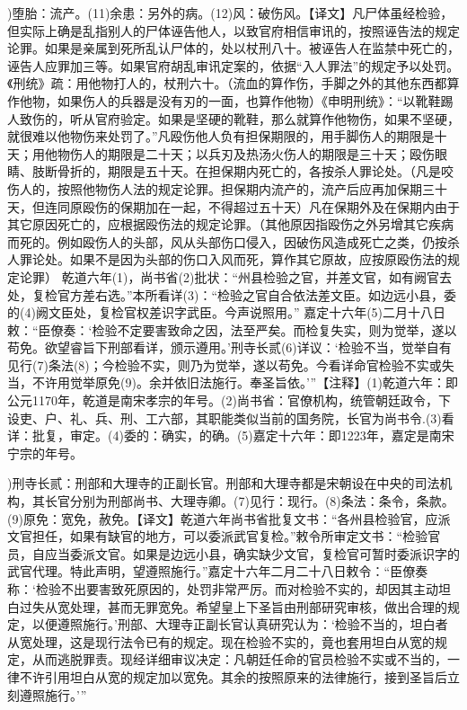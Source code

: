 \documentclass[12pt,UTF8]{ctexbook}
\begin{document}
)堕胎：流产。(11)余患：另外的病。(12)风：破伤风。【译文】凡尸体虽经检验，但实际上确是乱指别人的尸体诬告他人，以致官府相信审讯的，按照诬告法的规定论罪。如果是亲属到死所乱认尸体的，处以杖刑八十。被诬告人在监禁中死亡的，诬告人应罪加三等。如果官府胡乱审讯定案的，依据“入人罪法”的规定予以处罚。《刑统》疏：用他物打人的，杖刑六十。（流血的算作伤，手脚之外的其他东西都算作他物，如果伤人的兵器是没有刃的一面，也算作他物）《申明刑统》：“以靴鞋踢人致伤的，听从官府验定。如果是坚硬的靴鞋，那么就算作他物伤，如果不坚硬，就很难以他物伤来处罚了。”凡殴伤他人负有担保期限的，用手脚伤人的期限是十天；用他物伤人的期限是二十天；以兵刃及热汤火伤人的期限是三十天；殴伤眼睛、肢断骨折的，期限是五十天。在担保期内死亡的，各按杀人罪论处。（凡是咬伤人的，按照他物伤人法的规定论罪。担保期内流产的，流产后应再加保期三十天，但连同原殴伤的保期加在一起，不得超过五十天）凡在保期外及在保期内由于其它原因死亡的，应根据殴伤法的规定论罪。（其他原因指殴伤之外另增其它疾病而死的。例如殴伤人的头部，风从头部伤口侵入，因破伤风造成死亡之类，仍按杀人罪论处。如果不是因为头部的伤口入风而死，算作其它原故，应按原殴伤法的规定论罪）
乾道六年(1)，尚书省(2)批状：“州县检验之官，并差文官，如有阙官去处，复检官方差右选。”本所看详(3)：“检验之官自合依法差文臣。如边远小县，委的(4)阙文臣处，复检官权差识字武臣。今声说照用。”
嘉定十六年(5)二月十八日敕：“臣僚奏：‘检验不定要害致命之因，法至严矣。而检复失实，则为觉举，遂以苟免。欲望睿旨下刑部看详，颁示遵用。’刑寺长贰(6)详议：‘检验不当，觉举自有见行(7)条法(8)；今检验不实，则乃为觉举，遂以苟免。今看详命官检验不实或失当，不许用觉举原免(9)。余并依旧法施行。奉圣旨依。’”【注释】(1)乾道六年：即公元1170年，乾道是南宋孝宗的年号。(2)尚书省：官僚机构，统管朝廷政令，下设吏、户、礼、兵、刑、工六部，其职能类似当前的国务院，长官为尚书令.(3)看详：批复，审定。(4)委的：确实，的确。(5)嘉定十六年：即1223年，嘉定是南宋宁宗的年号。

)刑寺长贰：刑部和大理寺的正副长官。刑部和大理寺都是宋朝设在中央的司法机构，其长官分别为刑部尚书、大理寺卿。(7)见行：现行。(8)条法：条令，条款。(9)原免：宽免，赦免。【译文】乾道六年尚书省批复文书：“各州县检验官，应派文官担任，如果有缺官的地方，可以委派武官复检。”敕令所审定文书：“检验官员，自应当委派文官。如果是边远小县，确实缺少文官，复检官可暂时委派识字的武官代理。特此声明，望遵照施行。”嘉定十六年二月二十八日敕令：“臣僚奏称：‘检验不出要害致死原因的，处罚非常严厉。而对检验不实的，却因其主动坦白过失从宽处理，甚而无罪宽免。希望皇上下圣旨由刑部研究审核，做出合理的规定，以便遵照施行。’刑部、大理寺正副长官认真研究认为：‘检验不当的，坦白者从宽处理，这是现行法令已有的规定。现在检验不实的，竟也套用坦白从宽的规定，从而逃脱罪责。现经详细审议决定：凡朝廷任命的官员检验不实或不当的，一律不许引用坦白从宽的规定加以宽免。其余的按照原来的法律施行，接到圣旨后立刻遵照施行。’”
\end{document}
